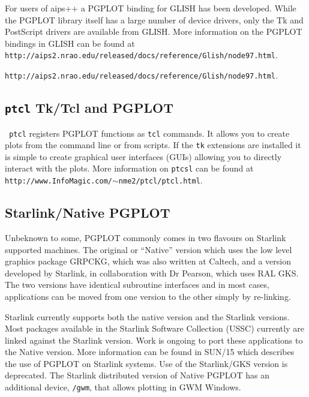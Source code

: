\documentclass[twoside,11pt]{article}
\newcommand{\htmladdnormallink}[2]{#1}
\newcommand{\htmlref}[2]{#1}
\newcommand{\latex}[1]{#1}
\newcommand{\xref}[3]{#1}
\newcommand{\xlabel}[1]{}
\begin{document}
For users of aips++ a PGPLOT binding for
\htmladdnormallink{GLISH}{http://www.cv.nrao.edu/glish/} has been
developed. While the PGPLOT library itself has a large number of
device drivers, only the Tk and PostScript drivers are available from
GLISH. More information on the PGPLOT bindings in GLISH can be found
at \latex{{\tt
http://aips2.nrao.edu/released/docs/reference/Glish/node97.html}.}
\begin{htmlonly}
\htmladdnormallink{{\tt http://aips2.nrao.edu/released/docs/reference/Glish/node97.html}}{http://aips2.nrao.edu/released/docs/reference/Glish/node97.html}.
\end{htmlonly}

\subsection{\xlabel{sc15_pgtcl}{\tt ptcl} Tk/Tcl and PGPLOT\label{sc15_pgtcl}}

\htmladdnormallink{{\tt
ptcl}}{http://www.InfoMagic.com/~nme2/ptcl/ptcl.html} registers PGPLOT
functions as {\tt tcl} commands.  It allows you to create plots from
the command line or from scripts. If the {\tt tk} extensions are
installed it is simple to create graphical user interfaces (GUIs)
allowing you to directly interact with the plots. \latex{ More
information on {\tt ptcsl} can be found at {\tt
http://www.InfoMagic.com/$\sim$nme2/ptcl/ptcl.html}.}

\subsection{\xlabel{sc15_pgstar}Starlink/Native PGPLOT\label{sc15_pgstar}}

Unbeknown to some, PGPLOT commonly comes in two flavours on Starlink
supported machines. The original or ``Native'' version which uses the
low level graphics package GRPCKG, which was also written at Caltech,
and a version developed by Starlink, in collaboration with Dr Pearson,
which uses \htmlref{RAL GKS}{sc15_gks}. The two versions have
identical subroutine interfaces and in most cases, applications can be
moved from one version to the other simply by re-linking.

Starlink currently supports both the native version and the Starlink
versions. Most packages available in the Starlink Software Collection
(USSC) currently are linked against the Starlink version. Work is
ongoing to port these applications to the Native version. More
information can be found in \xref{SUN/15}{sun15}{} which describes the
use of PGPLOT on Starlink systems. Use of the Starlink/GKS version is
deprecated. The Starlink distributed version of Native PGPLOT has an
additional device, {\tt /gwm}, that allows plotting in GWM Windows.
\end{document}
